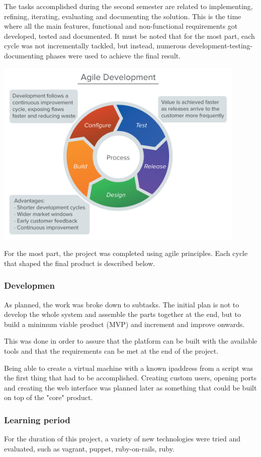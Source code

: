 \documentclass{article}
\begin{document}
The tasks accomplished during the second semester are related to implementing, refining, iterating, evaluating and documenting the solution. This is the time where all the main features, functional and non-functional requirements got developed, tested and documented. It must be noted that for the most part, each cycle was not incrementally tackled, but instead, numerous development-testing-documenting phases were used to achieve the final result.
\begin{center}
	\includegraphics[width=12cm]{agile.jpg}
\end{center}

For the most part, the project was completed using agile principles. Each cycle that shaped the final product is described below.
\subsubsection{Developmen}
As planned, the work was broke down to subtasks. The initial plan is not to develop the whole system and assemble the parts together at the end, but to build a minimum viable product (MVP) and increment and improve onwards.

This was done in order to assure that the platform can be built with the available tools and that the requirements can be met at the end of the project.

Being able to create a virtual machine with a known \gls{ipaddress} from a script was the first thing that had to be accomplished. Creating custom users, opening ports and creating the web interface was planned later as something that could be built on top of the "core" product.

\subsubsection{Learning period}
For the duration of this project, a variety of new technologies were tried and evaluated, such as \gls{vagrant}, \gls{puppet}, \gls{ruby-on-rails}, \gls{ruby}.
\end{document}
